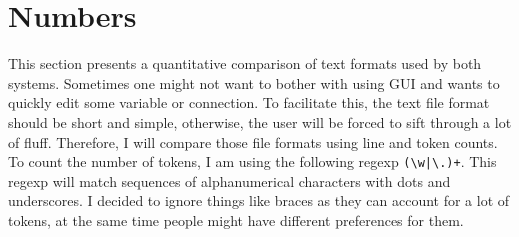 \documentclass[12pt]{report}
\begin{document}
\section{Numbers} 
This section presents a quantitative comparison of text formats used by both systems. Sometimes one might not want to bother with using GUI and wants to quickly edit some variable or connection. To facilitate this, the text file format should be short and simple, otherwise, the user will be forced to sift through a lot of fluff. Therefore, I will compare those file formats using line and token counts. 
To count the number of tokens, I am using the following regexp \verb!(\w|\.)+!. This regexp will match sequences of alphanumerical characters with dots and underscores. I decided to ignore things like braces as they can account for a lot of tokens, at the same time people might have different preferences for them. 
\end{document}
